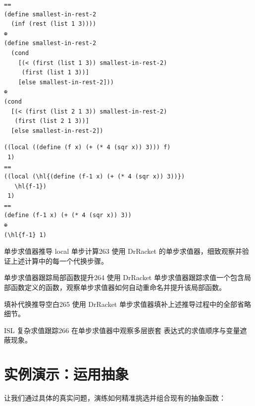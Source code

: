 \begin{stepperbox}
\begin{Verbatim}[commandchars=\\\{\}, fontsize=\footnotesize]
==
(define smallest-in-rest-2
  (inf (rest (list 1 3))))
⊕
(define smallest-in-rest-2
  (cond
    [(< (first (list 1 3)) smallest-in-rest-2)
     (first (list 1 3))]
    [else smallest-in-rest-2]))
⊕
(cond
  [(< (first (list 2 1 3)) smallest-in-rest-2)
   (first (list 2 1 3))]
  [else smallest-in-rest-2])
\end{Verbatim}
\end{stepperbox}

\begin{stepperbox}
\begin{Verbatim}[commandchars=\\\{\}, fontsize=\footnotesize]
((local ((define (f x) (+ (* 4 (sqr x)) 3))) f)
 1)
==
((local (\hl{(define (f-1 x) (+ (* 4 (sqr x)) 3))})
   \hl{f-1})
 1)
==
(define (f-1 x) (+ (* 4 (sqr x)) 3))
⊕
(\hl{f-1} 1)
\end{Verbatim}
\end{stepperbox}

\begin{exercise}{单步求值器推导 local 单步计算}{263}
使用 DrRacket 的单步求值器，细致观察并验证上述计算中的每一个代换步骤。
\end{exercise}

\begin{exercise}{单步求值器跟踪局部函数提升}{264}
使用 DrRacket 单步求值器跟踪求值一个包含局部函数定义的函数，观察单步求值器如何自动重命名并提升该局部函数。
\end{exercise}

\begin{exercise}{填补代换推导空白}{265}
使用 DrRacket 单步求值器填补上述推导过程中的全部省略细节。
\end{exercise}

\begin{exercise}{ISL 复杂求值跟踪}{266}
在单步求值器中观察多层嵌套  表达式的求值顺序与变量遮蔽现象。
\end{exercise}

\section{实例演示：运用抽象}
\label{sec:16_5}

让我们通过具体的真实问题，演练如何精准挑选并组合现有的抽象函数：

